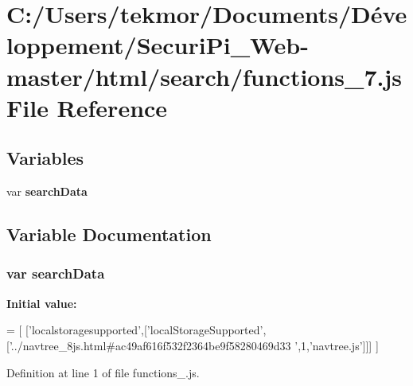 \section{C\+:/\+Users/tekmor/\+Documents/\+Développement/\+Securi\+Pi\+\_\+\+Web-\/master/html/search/functions\+\_\+7.js File Reference}
\label{functions__7_8js}
\subsection*{Variables}
\begin{DoxyCompactItemize}
\item 
var {\bf search\+Data}
\end{DoxyCompactItemize}


\subsection{Variable Documentation}
\subsubsection[{search\+Data}]{\setlength{\rightskip}{0pt plus 5cm}var search\+Data}\label{functions__7_8js_ad01a7523f103d6242ef9b0451861231e}
{\bfseries Initial value\+:}
\begin{DoxyCode}
=
[
  [\textcolor{stringliteral}{'localstoragesupported'},[\textcolor{stringliteral}{'localStorageSupported'},[\textcolor{stringliteral}{'../navtree\_8js.html#ac49af616f532f2364be9f58280469d33
      '},1,\textcolor{stringliteral}{'navtree.js'}]]]
]
\end{DoxyCode}


Definition at line 1 of file functions\+\_.\+js.

